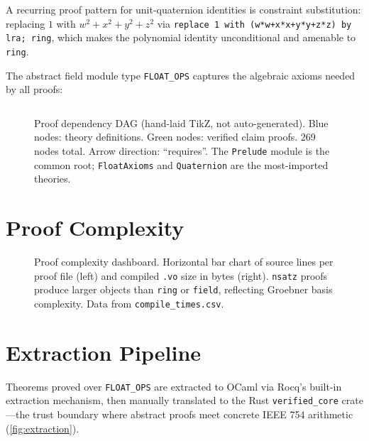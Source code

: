 \documentclass[12pt,openany]{report}
\theoremstyle{definition}
\theoremstyle{plain}
\theoremstyle{remark}
\newcommand{\prooffilecount}{269}
\newcommand{\proofmetrics}{data}
\begin{document}
A recurring proof pattern for unit-quaternion identities is constraint
substitution: replacing $1$ with $w^2 + x^2 + y^2 + z^2$ via
\texttt{replace 1 with (w*w+x*x+y*y+z*z) by lra; ring}, which
makes the polynomial identity unconditional and amenable to
\texttt{ring}.

The abstract field module type \texttt{FLOAT\_OPS} captures the algebraic
axioms needed by all proofs:

\inputminted[firstline=17,lastline=44,fontsize=\scriptsize]{coq}{../../proofs/theories/FloatAxioms.v}

\begin{figure}[htbp]
\centering

\caption{Proof dependency DAG (hand-laid TikZ, not auto-generated).
Blue nodes: theory definitions.  Green nodes: verified claim proofs.
\prooffilecount{} nodes total.  Arrow direction: ``requires''.
The \texttt{Prelude} module is the common root; \texttt{FloatAxioms}
and \texttt{Quaternion} are the most-imported theories.}
\label{fig:proof-dag}
\end{figure}

\section{Proof Complexity}

\pgfplotstableread[col sep=comma, columns/file/.style={string type}]{\proofmetrics/compile_times.csv}\compiletimesdata

\begin{figure}[htbp]
\centering

\caption{Proof complexity dashboard.  Horizontal bar chart of source
lines per proof file (left) and compiled \texttt{.vo} size in bytes
(right).  \texttt{nsatz} proofs produce larger objects than
\texttt{ring} or \texttt{field}, reflecting Groebner basis complexity.
Data from \texttt{compile\_times.csv}.}
\label{fig:proof-complexity}
\end{figure}

\section{Extraction Pipeline}

Theorems proved over \texttt{FLOAT\_OPS} are extracted to OCaml via Rocq's
built-in extraction mechanism, then manually translated to the Rust
\texttt{verified\_core} crate---the trust boundary where abstract proofs
meet concrete IEEE 754 arithmetic (\cref{fig:extraction}).
\end{document}
